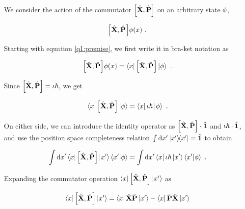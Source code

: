 
We consider the action of the commutator $\commutator{\Position}{\Momentum}$ 
on an arbitrary state $\phi$, 

\begin{equation}
    \commutator{\Position}{\Momentum} \statephi(\position)~.
    \label{q1:premise}
\end{equation}

Starting with equation \ref{q1:premise}, we first write it in
bra-ket notation as

\begin{equation}
    \commutator{\Position}{\Momentum} \statephi(\position) = 
        \bra{\position} \commutator{\Position}{\Momentum} \ket{\statephi}~.
\end{equation}

Since $\commutator{\Position}{\Momentum} = \iota \hbar$, we get

\begin{equation}
    \bra{\position} \commutator{\Position}{\Momentum} \ket{\statephi} =
        \bra{\position} \iota \hbar \ket{\statephi}~.
\end{equation}

On either side, we can introduce the identity operator as 
$\commutator{\Position}{\Momentum} \cdot \Identity$ and 
$\iota \hbar \cdot \hat{\textbf{1}}$, and use the 
position space completeness relation $\int 
\dd{x'} \ketbra{x'}{x'} = \hat{\textbf{1}}$ to obtain

\begin{equation}
    \int \dd{\position'} \bra{\position}\commutator{\Position}{\Momentum}
    \ket{\position'}\braket{\position'}{\statephi} =
    \int \dd{\position'} \bra{\position}\iota \hbar
    \ket{\position'}\braket{\position'}{\statephi}~.
\end{equation}

Expanding the commutator operation $\bra{\position}
\commutator{\Position}{\Momentum}\ket{\position'}$ as

\begin{equation}
    \bra{\position}\commutator{\Position}{\Momentum}\ket{\position'}
    = \bra{\position}\Position\Momentum\ket{\position'} - 
        \bra{\position}\Momentum\Position\ket{\position'} 
    \nonumber
\end{equation}

